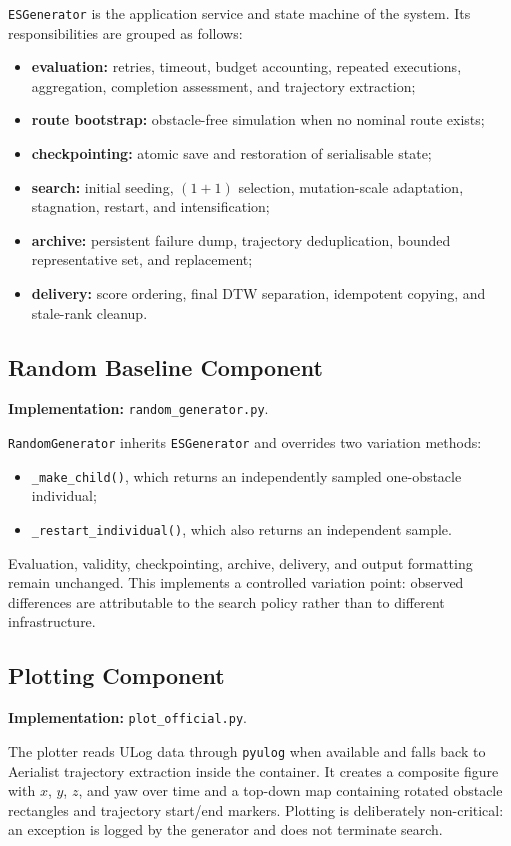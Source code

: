 \documentclass[11pt,a4paper]{report}
\newcommand{\code}[1]{\texttt{#1}}
\begin{document}
\code{ESGenerator} is the application service and state machine of the system. Its responsibilities are grouped as follows:
\begin{itemize}
  \item \textbf{evaluation:} retries, timeout, budget accounting, repeated executions, aggregation, completion assessment, and trajectory extraction;
  \item \textbf{route bootstrap:} obstacle-free simulation when no nominal route exists;
  \item \textbf{checkpointing:} atomic save and restoration of serialisable state;
  \item \textbf{search:} initial seeding, $(1+1)$ selection, mutation-scale adaptation, stagnation, restart, and intensification;
  \item \textbf{archive:} persistent failure dump, trajectory deduplication, bounded representative set, and replacement;
  \item \textbf{delivery:} score ordering, final DTW separation, idempotent copying, and stale-rank cleanup.
\end{itemize}

\subsection{Random Baseline Component}
\textbf{Implementation:} \code{random\_generator.py}.

\code{RandomGenerator} inherits \code{ESGenerator} and overrides two variation methods:
\begin{itemize}
  \item \code{\_make\_child()}, which returns an independently sampled one-obstacle individual;
  \item \code{\_restart\_individual()}, which also returns an independent sample.
\end{itemize}
Evaluation, validity, checkpointing, archive, delivery, and output formatting remain unchanged. This implements a controlled variation point: observed differences are attributable to the search policy rather than to different infrastructure.

\subsection{Plotting Component}
\textbf{Implementation:} \code{plot\_official.py}.

The plotter reads ULog data through \code{pyulog} when available and falls back to Aerialist trajectory extraction inside the container. It creates a composite figure with $x$, $y$, $z$, and yaw over time and a top-down map containing rotated obstacle rectangles and trajectory start/end markers. Plotting is deliberately non-critical: an exception is logged by the generator and does not terminate search.
\end{document}
